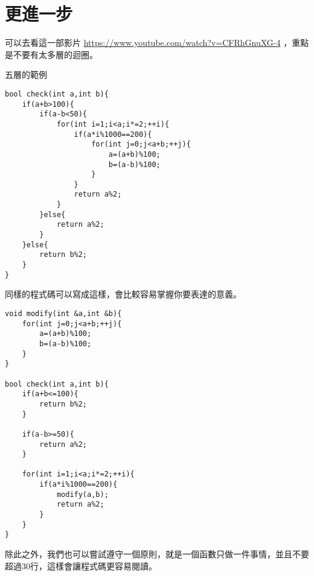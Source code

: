 \section{更進一步}
    可以去看這一部影片 \url{https://www.youtube.com/watch?v=CFRhGnuXG-4} ，重點是不要有太多層的迴圈。

    \example 五層的範例
    \begin{lstlisting}[caption=太多層的例子]
bool check(int a,int b){
    if(a+b>100){
        if(a-b<50){
            for(int i=1;i<a;i*=2;++i){
                if(a*i%1000==200){
                    for(int j=0;j<a+b;++j){
                        a=(a+b)%100;
                        b=(a-b)%100;
                    }
                }
                return a%2;
            }
        }else{
            return a%2;
        }
    }else{
        return b%2;
    }
}\end{lstlisting}

    同樣的程式碼可以寫成這樣，會比較容易掌握你要表達的意義。

    \begin{lstlisting}[caption=改進的版本]
void modify(int &a,int &b){
    for(int j=0;j<a+b;++j){
        a=(a+b)%100;
        b=(a-b)%100;
    }
}

bool check(int a,int b){
    if(a+b<=100){
        return b%2;
    }

    if(a-b>=50){
        return a%2;
    }
    
    for(int i=1;i<a;i*=2;++i){
        if(a*i%1000==200){
            modify(a,b);
            return a%2;
        }
    }
}\end{lstlisting}

    除此之外，我們也可以嘗試遵守一個原則，就是一個函數只做一件事情，並且不要超過30行，這樣會讓程式碼更容易閱讀。